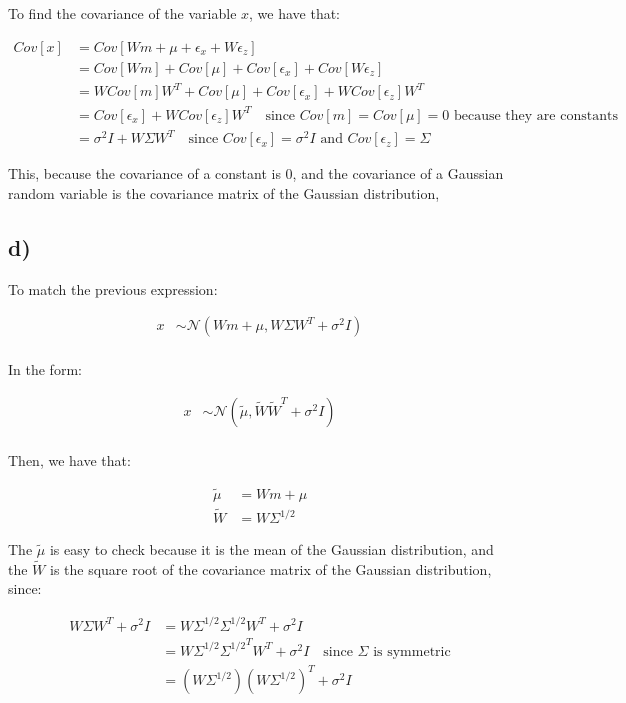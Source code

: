 \documentclass[12pt,a4paper,oneside]{paper}
\begin{document}
To find the covariance of the variable $x$, we have that:

\begin{align*}
    Cov[x] &= Cov[Wm + \mu + \epsilon_x + W\epsilon_z] \\
    &= Cov[Wm] + Cov[\mu] + Cov[\epsilon_x] + Cov[W\epsilon_z] \\
    &= W Cov[m] W^T + Cov[\mu] + Cov[\epsilon_x] + W Cov[\epsilon_z] W^T \\
    &= Cov[\epsilon_x] + W Cov[\epsilon_z] W^T \quad \text{since $Cov[m] = Cov[\mu] = 0$ because they are constants} \\
    &= \sigma^2 I + W \Sigma W^T \quad \text{since $Cov[\epsilon_x] = \sigma^2 I$ and $Cov[\epsilon_z] = \Sigma$}
\end{align*}

This, because the covariance of a constant is 0, and the covariance of a Gaussian random variable is the covariance matrix of the Gaussian distribution,

\subsection*{d)}

To match the previous expression:

\begin{align*}
    x &\sim \mathcal{N}(Wm + \mu, W \Sigma W^T + \sigma^2 I) \\
\end{align*}

In the form:

\begin{align*}
    x &\sim \mathcal{N}(\tilde{\mu}, \tilde{W} \tilde{W}^T + \sigma^2 I) \\
\end{align*}

Then, we have that:

\begin{align*}
    \tilde{\mu} &= Wm + \mu \\
    \tilde{W} &= W \Sigma^{1/2}
\end{align*}

The $\tilde{\mu}$ is easy to check because it is the mean of the Gaussian distribution, and the $\tilde{W}$ is the square root of the covariance matrix of the Gaussian distribution, since:

\begin{align*}
    W \Sigma W^T + \sigma^2 I &= W \Sigma^{1/2} \Sigma^{1/2} W^T + \sigma^2 I \\
    &= W \Sigma^{1/2} {\Sigma^{1/2}}^T W^T + \sigma^2 I \quad \text{since $\Sigma$ is symmetric} \\
    &= (W \Sigma^{1/2}) (W \Sigma^{1/2})^T + \sigma^2 I
\end{align*}
\end{document}
